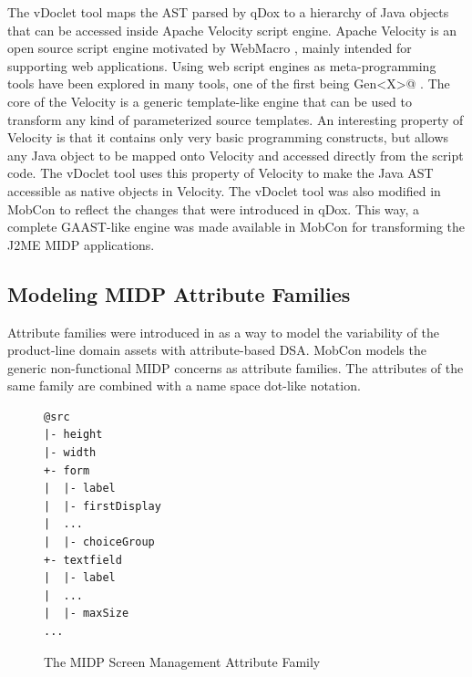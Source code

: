 The vDoclet tool maps the AST parsed by qDox to a hierarchy of Java objects that can be accessed inside Apache Velocity \cite{velocity} script engine. Apache Velocity is an open source script engine motivated by WebMacro \cite{www.webmacro}, mainly intended for supporting web applications. Using web script engines as meta-programming tools have been explored in many tools, one of the first being Gen\verb@<X>@ \cite{www.genx}. The core of the Velocity is a generic template-like engine that can be used to transform any kind of parameterized source templates. An interesting property of Velocity is that it contains only very basic programming constructs, but allows any Java object to be mapped onto Velocity and accessed directly from the script code. The vDoclet \cite{vdoclet} tool uses this property of Velocity to make the Java AST accessible as native objects in Velocity. The vDoclet tool was also modified in MobCon to reflect the changes that were introduced in qDox. This way, a complete GAAST-like engine was made available in MobCon for transforming the J2ME MIDP applications.

\subsection{Modeling MIDP Attribute Families}


Attribute families were introduced in  as a way to model the variability of the product-line domain assets with attribute-based DSA. MobCon models the generic non-functional MIDP concerns as attribute families. The attributes of the same family are combined with a name space dot-like notation.

\begin{figure}[ht]
	\centering
	\begin{minipage}[b]{5cm}
	\begin{center}	
\begin{footnotesize}
\begin{verbatim}
@src
|- height
|- width
+- form
|  |- label
|  |- firstDisplay
|  ...
|  |- choiceGroup
+- textfield
|  |- label
|  ...
|  |- maxSize
...
\end{verbatim}
\end{footnotesize}
	\end{center}
		\end{minipage}	
	\caption{The MIDP Screen Management Attribute Family}
	\label{mc:scr}

\end{figure}



